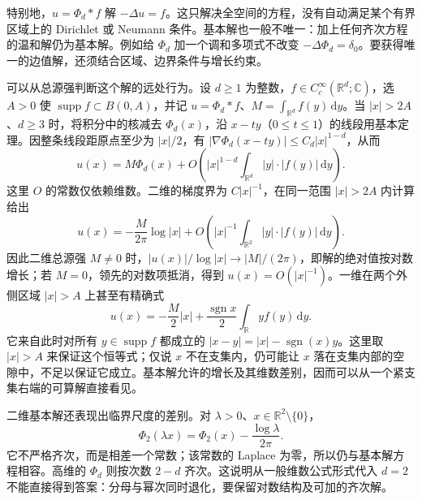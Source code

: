 特别地，\(u=\Phi_d*f\) 解 \(-\Delta u=f\)。这只解决全空间的方程，没有自动满足某个有界区域上的 Dirichlet 或 Neumann 条件。基本解也一般不唯一：加上任何齐次方程的温和解仍为基本解。例如给 \(\Phi_d\) 加一个调和多项式不改变 \(-\Delta\Phi_d=\delta_0\)。要获得唯一的边值解，还须结合区域、边界条件与增长约束。

\ProseParagraphBreak

可以从总源强判断这个解的远处行为。设 \(d\geq1\) 为整数，\(f\in C_c^\infty(\mathbb R^d;\mathbb C)\)，选 \(A>0\) 使 \(\operatorname{supp}f\subset B(0,A)\)，并记 \(u=\Phi_d*f\)、\(M=\int_{\mathbb R^d}f(y)\,\mathrm{d}y\)。当 \(|x|>2A\)、\(d\geq3\) 时，将积分中的核减去 \(\Phi_d(x)\)，沿 \(x-ty\)（\(0\leq t\leq1\)）的线段用基本定理。因整条线段距原点至少为 \(|x|/2\)，有 \(|\nabla\Phi_d(x-ty)|\leq C_d|x|^{1-d}\)，从而
\[
 u(x)=M\Phi_d(x)+O\left(|x|^{1-d}\int_{\mathbb R^d}|y|\cdot|f(y)|\,\mathrm{d}y\right).
\]
这里 \(O\) 的常数仅依赖维数。二维的梯度界为 \(C|x|^{-1}\)，在同一范围 \(|x|>2A\) 内计算给出
\[
 u(x)=-\frac{M}{2\pi}\log|x|
       +O\left(|x|^{-1}\int_{\mathbb R^2}|y|\cdot|f(y)|\,\mathrm{d}y\right).
\]
因此二维总源强 \(M\ne0\) 时，\(|u(x)|/\log|x|\to|M|/(2\pi)\)，即解的绝对值按对数增长；若 \(M=0\)，领先的对数项抵消，得到 \(u(x)=O(|x|^{-1})\)。一维在两个外侧区域 \(|x|>A\) 上甚至有精确式
\[
 u(x)=-\frac M2|x|+\frac{\operatorname{sgn}x}{2}\int_{\mathbb R}y f(y)\,\mathrm{d}y.
\]
它来自此时对所有 \(y\in\operatorname{supp}f\) 都成立的 \(|x-y|=|x|-\operatorname{sgn}(x)y\)。这里取 \(|x|>A\) 来保证这个恒等式；仅说 \(x\) 不在支集内，仍可能让 \(x\) 落在支集内部的空隙中，不足以保证它成立。基本解允许的增长及其维数差别，因而可以从一个紧支集右端的可算解直接看见。

\ProseParagraphBreak

二维基本解还表现出临界尺度的差别。对 \(\lambda>0\)、\(x\in\mathbb R^2\setminus\{0\}\)，
\[
 \Phi_2(\lambda x)=\Phi_2(x)-\dfrac{\log\lambda}{2\pi}.
\]
它不严格齐次，而是相差一个常数；该常数的 Laplace 为零，所以仍与基本解方程相容。高维的 \(\Phi_d\) 则按次数 \(2-d\) 齐次。这说明从一般维数公式形式代入 \(d=2\) 不能直接得到答案：分母与幂次同时退化，要保留对数结构及可加的齐次解。
